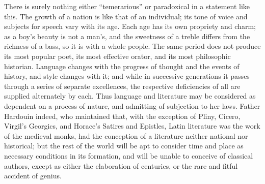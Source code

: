 There is surely nothing either ``temerarious'' or
paradoxical in a statement like this. The growth of a nation is like
that of an individual; its tone of voice and subjects for speech vary
with its age. Each age has its own propriety and charm; as a boy's
beauty is not a man's, and the sweetness of a treble differs from the
richness of a bass, so it is with a whole people. The same period does
not produce its most popular poet, its most effective orator, and its
most philosophic historian. Language changes with the progress of
thought and the events of history, and style changes with it; and
while in successive generations it passes through a series of separate
excellences, the respective deficiencies of all are supplied
alternately by each. Thus language and literature may be considered as
dependent on a process of nature, and admitting of subjection to her
laws. Father Hardouin indeed, who maintained that, with the exception
of Pliny, Cicero, Virgil's Georgics, and Horace's Satires and
Epistles, Latin literature was the work of the medieval monks, had the
conception of a literature neither national nor historical; but the
rest of the world will be apt to consider time and place as necessary
conditions in its formation, and will be unable to conceive of
classical authors, except as either the elaboration of centuries, or
the rare and fitful accident of genius.

